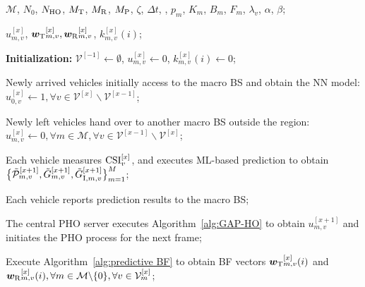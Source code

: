 \documentclass[10pt,journal,letterpaper]{journal_template/IEEEtran}
\newcommand{\rev}[1]{\textcolor{revisioncolor}{{}#1}}
\newif\ifshowdeletions
\newcommand{\currentdel}[1]{\ifshowdeletions\textcolor{deletioncolor}{\sout{#1}}\fi}
\theoremstyle{remark}
\begin{document}
\iffalse
    \begin{algorithm}[htbp]
        \caption{ML-Based Energy-Efficient Proactive Coordination of Handover, Beamforming and Resource Allocation (MEET-COBRA)}
        \label{alg:MEET-COBRA}
        \renewcommand{\algorithmicrequire}{\textbf{Input:}}
        \renewcommand{\algorithmicensure}{\textbf{Output:}}
        \begin{algorithmic}[1] %
            \REQUIRE  %
            $\mathcal{M}$, $N_0$, $N_{\textup{HO}}$, $M_{\rm T}$, $M_{\rm R}$, $M_{\rm P}$, $\zeta$, $\Delta t$, \currentdel{$\tau^{{\rm th}}$}, $p_m$, $K_m$, $B_m$, $F_m$, $\lambda_v$, $\alpha$, $\beta$;
            
            \ENSURE %
            $u_{m,v}^{[x]}$,
            ${\bm{w}_{\rm T}}_{m,v}^{[x]},{\bm{w}_{\rm R}}_{m,v}^{[x]}$,
            $k_{m,v}^{[x]}(i)$;
    
            \STATE \textbf{Initialization:}  $\mathcal{V}^{[-1]} \leftarrow \emptyset$, $u_{m,v}^{[x]} \leftarrow 0$, $k_{m,v}^{[x]}(i) \leftarrow 0$;
            
                \STATE Newly arrived vehicles initially access to the macro BS and obtain the NN model: $u_{0,v}^{[x]} \leftarrow 1, \forall v \in \mathcal{V}^{[x]} \backslash \mathcal{V}^{[x-1]}$;
                
                \STATE Newly left vehicles hand over to another macro BS outside the region: $u_{m,v}^{[x]} \leftarrow 0, \forall m \in \mathcal{M}, \forall v \in \mathcal{V}^{[x-1]} \backslash \mathcal{V}^{[x]}$;
                
                \STATE Each vehicle measures ${\rm CSI}_v^{[x]}$, and executes ML-based prediction to obtain $\bigl\{\Tilde{\mathcal{P}}_{m,v}^{[x+1]}, \Tilde{G}_{m,v}^{[x+1]}, \Tilde{G}_{{\rm I},m,v}^{[x+1]}\bigr\}_{m=1}^M$;
    
                \STATE Each vehicle reports prediction results to the macro BS;
                
                \STATE The central PHO server executes Algorithm~\ref{alg:GAP-HO} to obtain $u_{m,v}^{[x+1]}$ and initiates the PHO process for the next frame;
                
                    
                    \STATE Execute Algorithm~\ref{alg:predictive BF} to obtain BF vectors ${\bm{w}_{\rm T}}_{m,v}^{[x]}(i)$ and ${\bm{w}_{\rm R}}_{m,v}^{[x]}(i), \forall m \in \mathcal{M}\backslash\{0\}, \forall v\in \mathcal{V}^{[x]}_m$;
    

\end{algorithmic}
\end{algorithm}
\end{document}
